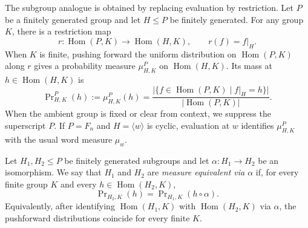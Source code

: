 \documentclass[11pt]{amsart}
\theoremstyle{plain}
\theoremstyle{definition}
\newcommand{\Hom}{\operatorname{Hom}}
\begin{document}
The subgroup analogue is obtained by replacing evaluation by restriction. Let
$P$ be a finitely generated group and let $H\le P$ be finitely generated. For
any group $K$, there is a restriction map
\[
  r\colon\Hom(P,K)\longrightarrow\Hom(H,K),\qquad r(f)=f|_H .
\]
When $K$ is finite, pushing forward the uniform distribution on $\Hom(P,K)$
along $r$ gives a probability measure $\mu^P_{H,K}$ on $\Hom(H,K)$. Its mass
at $h\in\Hom(H,K)$ is
\[
  \Pr\nolimits^{P}_{H,K}(h)
  :=\mu^P_{H,K}(h)
  =\frac{\bigl|\{f\in\Hom(P,K)\mid f|_H=h\}\bigr|}
          {|\Hom(P,K)|}.
\]
When the ambient group is fixed or clear from context, we suppress the
superscript $P$. If $P=F_n$ and $H=\langle w\rangle$ is cyclic, evaluation at
$w$ identifies $\mu^P_{H,K}$ with the usual word measure $\mu_w$.

Let $H_1,H_2\le P$ be finitely generated subgroups and let
$\alpha\colon H_1\to H_2$ be an isomorphism. We say that $H_1$ and $H_2$ are
\emph{measure equivalent via $\alpha$} if, for every finite group $K$ and every
$h\in\Hom(H_2,K)$,
\begin{equation}\label{eq:meq}
  \Pr\nolimits_{H_2,K}(h)=\Pr\nolimits_{H_1,K}(h\circ\alpha).
\end{equation}
Equivalently, after identifying $\Hom(H_1,K)$ with $\Hom(H_2,K)$ via $\alpha$,
the pushforward distributions coincide for every finite $K$.
\end{document}
